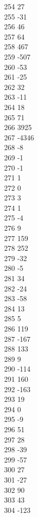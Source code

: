 { 254	27 \\
 255	-31 \\
 256	46 \\
 257	64 \\
 258	467 \\
 259	-507 \\
 260	-53 \\
 261	-25 \\
 262	32 \\
 263	-11 \\
 264	18 \\
 265	71 \\
 266	3925 \\
 267	-4346 \\
 268	-8 \\
 269	-1 \\
 270	-1 \\
 271	1 \\
 272	0 \\
 273	3 \\
 274	1 \\
 275	-4 \\
 276	9 \\
 277	159 \\
 278	252 \\
 279	-32 \\
 280	-5 \\
 281	34 \\
 282	-24 \\
 283	-58 \\
 284	13 \\
 285	5 \\
 286	119 \\
 287	-167 \\
 288	133 \\
 289	9 \\
 290	-114 \\
 291	160 \\
 292	-163 \\
 293	19 \\
 294	0 \\
 295	-9 \\
 296	51 \\
 297	28 \\
 298	-39 \\
 299	-57 \\
 300	27 \\
 301	-27 \\
 302	90 \\
 303	43 \\
 304	-123 \\
}
